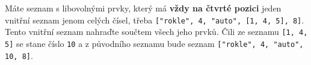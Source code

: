 \question[50]
Máte seznam s libovolnými prvky, který má \textbf{vždy na čtvrté pozici} jeden
vnitřní seznam jenom celých čísel, třeba \texttt{["rokle", 4, "auto", [1, 4, 5],
8]}. Tento vnitřní seznam nahraďte součtem všech jeho prvků. Čili ze seznamu
\texttt{[1, 4, 5]} se stane číslo \texttt{10} a z původního seznamu bude seznam
\texttt{["rokle", 4, "auto", 10, 8]}.
